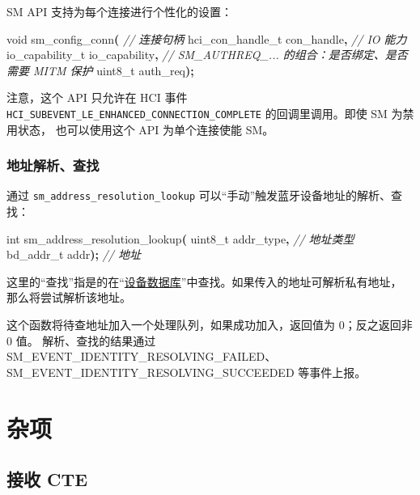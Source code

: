 \documentclass[
  12pt,
]{book}
\newenvironment{Shaded}{\begin{snugshade}}{\end{snugshade}}
\newcommand{\CommentTok}[1]{\textcolor[rgb]{0.56,0.35,0.01}{\textit{#1}}}
\newcommand{\DataTypeTok}[1]{\textcolor[rgb]{0.13,0.29,0.53}{#1}}
\newcommand{\NormalTok}[1]{#1}
\newcommand{\OperatorTok}[1]{\textcolor[rgb]{0.81,0.36,0.00}{\textbf{#1}}}
\begin{document}
SM API 支持为每个连接进行个性化的设置：

\begin{Shaded}
\begin{Highlighting}[]
\DataTypeTok{void}\NormalTok{ sm\_config\_conn}\OperatorTok{(}
  \CommentTok{// 连接句柄}
\NormalTok{  hci\_con\_handle\_t con\_handle}\OperatorTok{,}
  \CommentTok{// IO 能力}
\NormalTok{  io\_capability\_t io\_capability}\OperatorTok{,}
  \CommentTok{// SM\_AUTHREQ\_... 的组合：是否绑定、是否需要 MITM 保护}
  \DataTypeTok{uint8\_t}\NormalTok{ auth\_req}\OperatorTok{);}
\end{Highlighting}
\end{Shaded}

注意，这个 API 只允许在 HCI 事件 \texttt{HCI\_SUBEVENT\_LE\_ENHANCED\_CONNECTION\_COMPLETE} 的回调里调用。即使 SM 为禁用状态，
也可以使用这个 API 为单个连接使能 SM。

\hypertarget{ux5730ux5740ux89e3ux6790ux67e5ux627e}{%
\subsection{地址解析、查找}\label{ux5730ux5740ux89e3ux6790ux67e5ux627e}}

通过 \texttt{sm\_address\_resolution\_lookup} 可以``手动''触发蓝牙设备地址的解析、查找：

\begin{Shaded}
\begin{Highlighting}[]
\DataTypeTok{int}\NormalTok{ sm\_address\_resolution\_lookup}\OperatorTok{(}
  \DataTypeTok{uint8\_t}\NormalTok{ addr\_type}\OperatorTok{,}  \CommentTok{// 地址类型}
\NormalTok{  bd\_addr\_t addr}\OperatorTok{);}    \CommentTok{// 地址}
\end{Highlighting}
\end{Shaded}

这里的``查找''指是的在``\protect\hyperlink{ch98-le-dev-db}{设备数据库}''中查找。如果传入的地址可解析私有地址，
那么将尝试解析该地址。

这个函数将待查地址加入一个处理队列，如果成功加入，返回值为 0；反之返回非 0 值。
解析、查找的结果通过 SM\_EVENT\_IDENTITY\_RESOLVING\_FAILED、
SM\_EVENT\_IDENTITY\_RESOLVING\_SUCCEEDED 等事件上报。

\hypertarget{ch-misc}{%
\chapter{杂项}\label{ch-misc}}

\hypertarget{ux63a5ux6536-cte}{%
\section{接收 CTE}\label{ux63a5ux6536-cte}}
\end{document}
